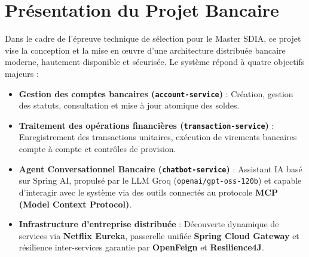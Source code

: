 \documentclass[11pt,a4paper]{report}
\begin{document}
\section{Présentation du Projet Bancaire}
Dans le cadre de l'épreuve technique de sélection pour le Master SDIA, ce projet vise la conception et la mise en œuvre d'une architecture distribuée bancaire moderne, hautement disponible et sécurisée. Le système répond à quatre objectifs majeurs :
\begin{itemize}[label=\textcolor{secondary}{\textbullet}]
    \item \textbf{Gestion des comptes bancaires (\texttt{account-service})} : Création, gestion des statuts, consultation et mise à jour atomique des soldes.
    \item \textbf{Traitement des opérations financières (\texttt{transaction-service})} : Enregistrement des transactions unitaires, exécution de virements bancaires compte à compte et contrôles de provision.
    \item \textbf{Agent Conversationnel Bancaire (\texttt{chatbot-service})} : Assistant IA basé sur Spring AI, propulsé par le LLM Groq (\texttt{openai/gpt-oss-120b}) et capable d'interagir avec le système via des outils connectés au protocole \textbf{MCP (Model Context Protocol)}.
    \item \textbf{Infrastructure d'entreprise distribuée} : Découverte dynamique de services via \textbf{Netflix Eureka}, passerelle unifiée \textbf{Spring Cloud Gateway} et résilience inter-services garantie par \textbf{OpenFeign} et \textbf{Resilience4J}.
\end{itemize}
\end{document}
